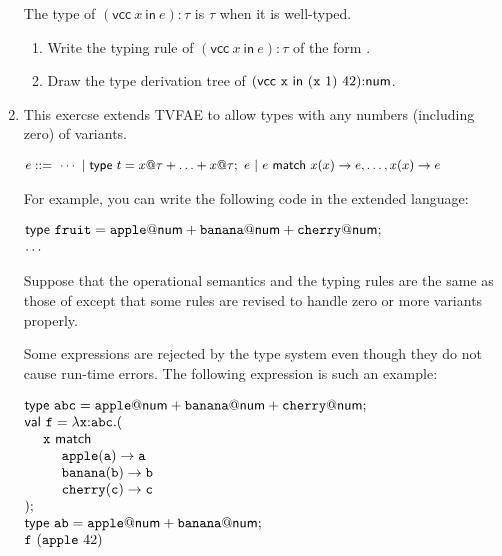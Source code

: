 \begin{enumerate}
    The type of
    $(\textsf{vcc}\ x\ \textsf{in}\ e){:}\tau$ is $\tau$ when it is well-typed.

\begin{enumerate}
  \item
    Write the typing rule of $(\textsf{vcc}\ x\ \textsf{in}\ e){:}\tau$
    of the form .
  \item Draw the type derivation tree of
    $(\textsf{vcc}\ {\code{x}}\ \textsf{in}\ {\eapp{(\eapp{\code{x}}{1})}{42}}){:}\textsf{num}$.
\end{enumerate}

\item This exercse extends \textsf{TVFAE} to allow types with any numbers (including zero) of variants.

\vspace{0.5em}
$
    \small
  \begin{array}{@{}l}
    e ::=\ \cdots\ |\ {\textsf{type}}\ t=x@\tau+\ldots+x@\tau;\ e\ |\
           e\ {\textsf{match}}\ x(x)\rightarrow e,\ldots,x(x)\rightarrow e \\
  \end{array}
$

For example, you can write the following code in the extended language:

\vspace{0.5em}
$
  \begin{array}{@{}l}
    {\textsf{type}}\ \code{fruit}=\code{apple}@\tnum+\code{banana}@\tnum+\code{cherry}@\tnum;\\
    \ldots
  \end{array}
$
\vspace{0.5em}

Suppose that the operational semantics and the typing rules are the same as
those of \code{TVFAE} except that some rules are revised to handle zero or more
variants properly.

Some expressions are rejected by the type system even though
they do not cause run-time errors. The following expression is such an example:

\vspace{0.5em}
$
  \begin{array}{@{}l}
    \textsf{type}\ \code{abc}=\code{apple}@\tnum+\code{banana}@\tnum+\code{cherry}@\tnum;\\
    \textsf{val}\ \code{f}=\efun{\code{x}{:}\code{abc}}{(}\\
    \ \ \ \ \code{x}\ \textsf{match} \\
    \ \ \ \ \ \ \ \ \code{apple}(\code{a})\rightarrow\code{a} \\
    \ \ \ \ \ \ \ \ \code{banana}(\code{b})\rightarrow\code{b} \\
    \ \ \ \ \ \ \ \ \code{cherry}(\code{c})\rightarrow\code{c} \\
    );\\
    \textsf{type}\ \code{ab}=\code{apple}@\tnum+\code{banana}@\tnum;\\
    \eapp{\code{f}}{(\eapp{\code{apple}}{42})}
  \end{array}
$
\vspace{0.5em}


\end{enumerate}
